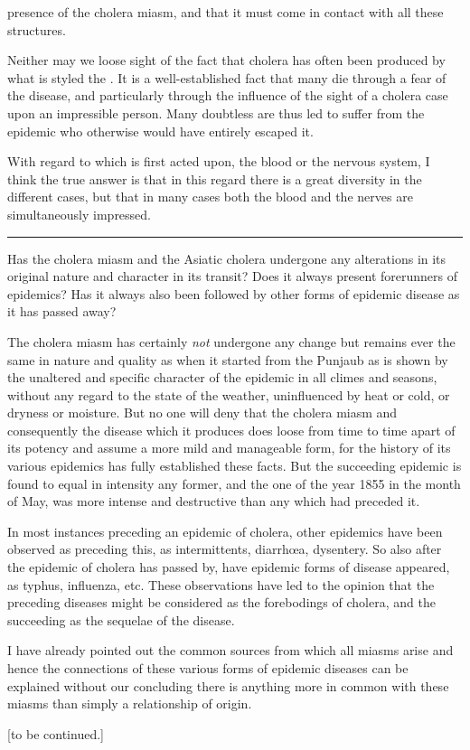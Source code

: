 presence of the cholera miasm, and that it must come in contact with
all these structures.

Neither may we loose sight of the fact that cholera has often been
produced by what is styled the . It is a well-established
fact that many die through a fear of the disease, and particularly
through the influence of the sight of a cholera case upon an
impressible person. Many doubtless are thus led to suffer from the
epidemic who otherwise would have entirely escaped it.

With regard to which is first acted upon, the blood or the nervous
system, I think the true answer is that in this regard there is a great
diversity in the different cases, but that in many cases both the blood
and the nerves are simultaneously impressed.

\plainbreak{1}

Has the cholera miasm and the Asiatic cholera undergone any alterations
in its original nature and character in its transit? Does it always
present forerunners of epidemics? Has it always also been followed by
other forms of epidemic disease as it has passed away?

The cholera miasm has certainly \emph{not} undergone any change but remains
ever the same in nature and quality as when it started from the
Punjaub as is shown by the unaltered and specific character of the epidemic
in all climes and seasons, without any regard to the state of the
weather, uninfluenced by heat or cold, or dryness or moisture. But no
one will deny that the cholera miasm and consequently the disease
which it produces does loose from time to time apart of its potency and
assume a more mild and manageable form, for the history of its various
epidemics has fully established these facts. But the succeeding epidemic
is found to equal in intensity any former, and the one of the year
1855 in the month of May, was more intense and destructive than any
which had preceded it.

In most instances preceding an epidemic of cholera, other epidemics
have been observed as preceding this, as intermittents, diarrhœa, dysentery.
So also after the epidemic of cholera has passed by, have
epidemic forms of disease appeared, as typhus, influenza, etc. These
observations have led to the opinion that the preceding diseases might
be considered as the forebodings of cholera, and the succeeding as the
sequelae of the disease.

I have already pointed out the common sources from which all
miasms arise and hence the connections of these various forms of epidemic
diseases can be explained without our concluding there is anything
more in common with these miasms than simply a relationship
of origin.

[to be continued.]\endinput